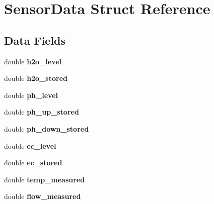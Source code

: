 \hypertarget{struct_sensor_data}{}\section{Sensor\+Data Struct Reference}
\label{struct_sensor_data}
\subsection*{Data Fields}
\begin{DoxyCompactItemize}
\item 
\mbox{\label{struct_sensor_data_ae607073be4fd6023e3614b8e2ea632c3}} 
double {\bfseries h2o\+\_\+level}
\item 
\mbox{\label{struct_sensor_data_a66943c932b81ea81e33bbd8ca4be161f}} 
double {\bfseries h2o\+\_\+stored}
\item 
\mbox{\label{struct_sensor_data_abc9b98e771a1ecb67b46dcfd147d00cf}} 
double {\bfseries ph\+\_\+level}
\item 
\mbox{\label{struct_sensor_data_a707282e55e0433cb24b27e1a323ba9aa}} 
double {\bfseries ph\+\_\+up\+\_\+stored}
\item 
\mbox{\label{struct_sensor_data_a5c644966125ee898e1356e117880deeb}} 
double {\bfseries ph\+\_\+down\+\_\+stored}
\item 
\mbox{\label{struct_sensor_data_a582495bef90bb453cdad51cbd977aee9}} 
double {\bfseries ec\+\_\+level}
\item 
\mbox{\label{struct_sensor_data_ac6eb57ac7969f4c728858439048ced8c}} 
double {\bfseries ec\+\_\+stored}
\item 
\mbox{\label{struct_sensor_data_acfb04c92d441ce9c072717de8d32d3ad}} 
double {\bfseries temp\+\_\+measured}
\item 
\mbox{\label{struct_sensor_data_a289e6436edcbb21e633e3dcec98de8a0}} 
double {\bfseries flow\+\_\+measured}
\item 
\mbox{\label{struct_sensor_data_a2f412668a8cf3ab1e6f960118c20f238}} 

\end{DoxyCompactItemize}
